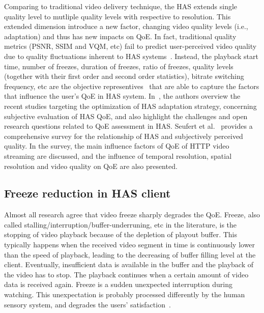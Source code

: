 \documentclass[journal]{IEEEtran}
\begin{document}
Comparing to traditional video delivery technique, the HAS extends single quality level to mutliple quality levels with respective to resolution. This extended dimension introduce a new factor, changing video quality levels (i.e., adaptation) and thus has new impacts on QoE. In fact, traditional quality metrics (PSNR, SSIM and VQM, etc) fail to predict user-perceived video quality due to quality fluctuations inherent to HAS systems~\cite{lievens2015perceptual}. Instead, the playback start time, number of freezes, duration of freezes, ratio of freezes, quality levels (together with their first order and second order statistics), bitrate switching frequency, etc are the objective representives~\cite{julurimeasurement} that are able to capture the factors that influence the user's QoE in HAS system. In~\cite{garciaquality}, the authors overview the recent studies targeting the optimization of HAS adaptation strategy, concerning subjective evaluation of HAS QoE, and also highlight the challenges and open research questions related to QoE assessment in HAS. Seufert et al.~\cite{seufertsurvey} provides a comprehensive survey for the relationship of HAS and subjectively perceived quality. In the survey, the main influence factors of QoE of HTTP video streaming are discussed, and the influence of temporal resolution, spatial resolution and video quality on QoE are also presented.

\subsection{Freeze reduction in HAS client}
Almost all research agree that video freeze sharply degrades the QoE. Freeze, also called stalling/interruption/buffer-underruning, etc in the literature, is the stopping of video playback because of the depletion of playout buffer. This typically happens when the received video segment in time is continuously lower than the speed of playback, leading to the decreasing of buffer filling level at the client. Eventually, insufficient data is available in the buffer and the playback of the video has to stop. The playback continues when a certain amount of video data is received again. Freeze is a sudden unexpected interruption during watching. This unexpectation is probably processed differently by the human sensory system, and degrades the users' satisfaction~\cite{sackl2013evaluating}. 
\end{document}
